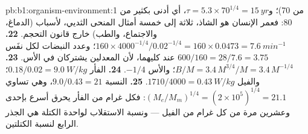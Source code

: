 \begin{solution}{pb:b1:organism-environment:1}
من 70)؛ و$\tau = 5.3\times 70^{1/4} = \qty{15}{yr}$، أي أدنى بكثير
من 80: فعمر الإنسان هو الشاذ، ثلاثة إلى خمسة أمثال المنحى الثديي،
لأسباب (الدماغ، والاجتماع، والطب) خارج قانون التحجم.
\textbf{22.} $160\times 4000^{-1/4}/0.02^{-1/4} = 160\times 0.0473 =
\qty{7.6}{min^{-1}}$؛ وعدد النبضات لكل نفَس
$600/160 = 28/7.6 = 3.75$ عند كليهما، لأن المعدلين يشتركان في الأس.
\textbf{23.} $B/M = 3.4\,M^{3/4}/M = 3.4\,M^{-1/4}$؛ والأس $-1/4$.
\textbf{24.} الفأر $0.18/0.02 = \qty{9.0}{W/kg}$؛ والفيل
$1710/4000 =
\qty{0.43}{W/kg}$.
\textbf{25.} النسبة $9.0/0.43 = 21$، وهي تساوي
$(M_e/M_m)^{1/4} =
(2\times 10^5)^{1/4} = 21.1$: فكل غرام من الفأر
يحرق أسرع بإحدى وعشرين مرة من كل غرام من الفيل --- ونسبة الاستقلاب
لواحدة الكتلة هي الجذر الرابع لنسبة الكتلتين.
\end{solution}
